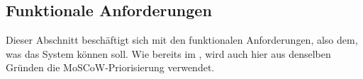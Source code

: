 \subsection{Funktionale Anforderungen}\label{subsection:anforderung:funktionaleAnforderungen}
Dieser Abschnitt beschäftigt sich mit den funktionalen Anforderungen, also dem, was das System können soll. Wie bereits im  , wird auch hier aus denselben Gründen die MoSCoW-Priorisierung verwendet.





%
%


